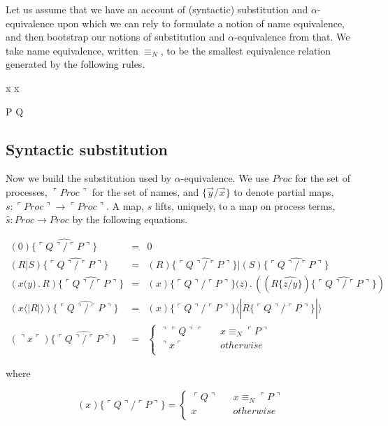 \documentclass[]{amsart}
\newcommand{\lliftb}{\langle\!|}
\newcommand{\rliftb}{|\!\rangle}
\newcommand{\lpquote}{\ulcorner}
\newcommand{\rpquote}{\urcorner}
\newcommand{\id}[1]{\texttt{#1}}
\newcommand{\juxtap}{\mathbin{\id{|}}}
\newcommand{\concat}{\mathbin{.}}
\newcommand{\scong}{\mathbin{\equiv}}
\newcommand{\nameeq}{\mathbin{\equiv_N}}
\newcommand{\lift}[2]{#1 \lliftb #2 \rliftb}
\newcommand{\quotep}[1]{\lpquote #1 \rpquote}
\newcommand{\dropn}[1]{\rpquote #1 \lpquote}
\newcommand{\substp}[2]{\id{\{} \quotep{#1} / \quotep{#2} \id{\}}}
\newcommand{\substn}[2]{\id{\{} #1 / #2 \id{\}}}
\newcommand{\psubstp}[2]{\widehat{\substp{#1}{#2}}}
\newcommand{\psubstn}[2]{\widehat{\substn{#1}{#2}}}
\newcommand{\Proc}{\mathbin{Proc}}
\newcommand{\QProc}{\quotep{\mathbin{Proc}}}
\theoremstyle{definition}
\theoremstyle{remark}
\numberwithin{equation}{subsection}
\begin{document}
Let us assume that we have an account of (syntactic) substitution and
$\alpha$-equivalence upon which we can rely to formulate a notion of
name equivalence, and then bootstrap our notions of substitution and
$\alpha$-equivalence from that. We take name equivalence, written
$\nameeq$, to be the smallest equivalence relation generated by the
following rules.


{ \quotep{\dropn{x}} \nameeq x }

\infrule[Struct-equiv]
{ P \scong Q }
{ \quotep{P} \nameeq \quotep{Q} }

\subsection{Syntactic substitution}

Now we build the substitution used by $\alpha$-equivalence. We use
$\Proc$ for the set of processes, $\QProc$ for the set of names, and
$\id{\{}\vec{y} / \vec{x} \id{\}}$ to denote partial maps, $s : \QProc
\rightarrow \QProc$. A map, $s$ lifts, uniquely, to a map on process terms, $\widehat{s} :
\Proc \rightarrow \Proc$ by the following equations.

\begin{eqnarray*}
(0) \psubstp{Q}{P}         & = &    0 \\
(R \juxtap S) \psubstp{Q}{P}
		& = &    
		(R)\psubstp{Q}{P} \juxtap (S) \psubstp{Q}{P} \\
(x \id{(} y\id{)}\concat R) \psubstp{Q}{P}    
		& = &    
		(x)\substp{Q}{P} \id{(}z\id{)}\concat( (R \psubstn{z}{y}) \psubstp{Q}{P} ) \\
(\lift{x}{R}) \psubstp{Q}{P}  
 		& = &
 		\lift{(x)\substp{Q}{P}}{ R \psubstp{Q}{P} } \\
(\dropn{x})  \psubstp{Q}{P}       
		& = & 
		\left\{ 
			\begin{array}{ccc} 
				\dropn{\quotep{Q}} & & x \nameeq \quotep{P} \\
                              	\dropn{x} & & otherwise \\
			\end{array}
		\right.
\end{eqnarray*}
 

where

\begin{equation*}
(x)\id{\{} \lpquote Q \rpquote / \lpquote P \rpquote \id{\}}            = 
		\left\{ 
			\begin{array}{ccc}
				\lpquote Q \rpquote & & x \nameeq \lpquote P \rpquote \\
                                x & & otherwise \\
			\end{array}
		\right.
\end{equation*}
\end{document}
